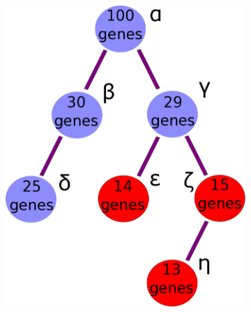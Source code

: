 \documentclass{bmcart}
\begin{document}
\begin{backmatter}
\begin{figure}[h!]
\begin{subfigure}[b]{0.3\textwidth}
    \includegraphics[width=\textwidth]{figures/FloorTrimmingOntogeny.png}
	      \caption{}
    \label{fig:trim_ends}
  \end{subfigure}
  \begin{subfigure}[b]{0.3\textwidth}

\end{subfigure}
\end{figure}
\end{backmatter}
\end{document}
